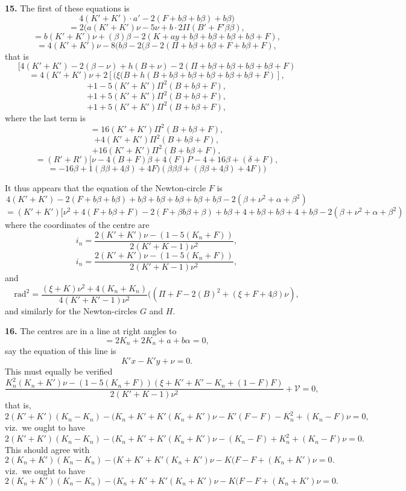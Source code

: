 \documentclass[11pt,a4paper]{article}
\begin{document}
\textbf{15.} The first of these equations is
\[
4(K' + K') \cdot a' - 2(F + b\beta + b\beta) + b\beta)
\]
\[
= 2(a (K' + K')\nu - 5\nu + b \cdot 2II (B' + F'\beta\beta),
\]
\[
= b(K' + K')\nu + (\beta)\beta - 2(K + a y + b\beta + b\beta + b\beta + b\beta + F),
\]
\[
= 4(K' + K')\nu - 8(b\beta - 2(\beta - 2(\Pi + b\beta + b\beta + F + b\beta + F),
\]
that is
\[
[4(K' + K') - 2(\beta - \nu) + h(B + \nu) - 2(\Pi + b\beta + b\beta + b\beta + b\beta + F)
\]
\[
= 4(K' + K')\nu + 2[(\xi(B + h(B + b\beta + b\beta + b\beta + b\beta + b\beta + F)],
\]
\[
+ 1 - 5(K' + K')\Pi^2(B + b\beta + F),
\]
\[
+ 1 + 5(K' + K')\Pi^2(B + b\beta + F),
\]
\[
+ 1 + 5(K' + K')\Pi^2(B + b\beta + F),
\]
where the last term is
\[
= 16(K' + K')\Pi^2(B + b\beta + F),
\]
\[
+ 4(K' + K')\Pi^2(B + b\beta + F),
\]
\[
+ 16(K' + K')\Pi^2(B + b\beta + F),
\]
\[
= (R' + R')[\nu - 4(B + F)\beta + 4(F)P - 4 + 16\beta + (\delta + F),
\]
\[
= - 16\beta + 1(\beta\beta + 4\beta) + 4F)(\beta\beta\beta + (\beta\beta + 4\beta) + 4F))
\]

It thus appears that the equation of the Newton-circle $F$ is
\[
4(K' + K') - 2(F + b\beta + b\beta) + b\beta + b\beta + b\beta + b\beta + b\beta - 2(\beta + \nu^2 + \alpha + \beta^2)
\]
\[
= (K' + K')[\nu^2 + 4(F + b\beta + F) - 2(F + \beta b\beta + \beta) + b\beta + 4 + b\beta + b\beta + 4 + b\beta - 2(\beta + \nu^2 + \alpha + \beta^2)
\]
where the coordinates of the centre are
\[
i_n = \frac{2(K' + K')\nu - (1 - 5(K_n + F))}{2(K' + K - 1)\nu^2},
\]
\[
i_n = \frac{2(K' + K')\nu - (1 - 5(K_n + F))}{2(K' + K - 1)\nu^2},
\]
and
\[
\text{rad}^2 = \frac{(\xi + K)\nu^2 + 4(K_n + K_n)}{4(K' + K' - 1)\nu^2}((\Pi + F - 2(B)^2 + (\xi + F + 4\beta)\nu),
\]
and similarly for the Newton-circles $G$ and $H$.

\textbf{16.} The centres are in a line at right angles to
\[
= 2K_n + 2K_n + a + b\alpha = 0,
\]
say the equation of this line is
\[
K' x - K' y + \nu = 0.
\]
This must equally be verified
\[
\frac{K_n^2(K_n + K')\nu - (1 - 5(K_n + F))(\xi + K' + K' - K_n + (1 - F)F)}{2(K' + K - 1)\nu^2} + \mathcal{V} = 0,
\]
that is,
\[
2(K' + K')(K_n - K_n) - (K_n + K' + K'( K_n + K')\nu - K'(F - F) - K_n^2 + (K_n - F)\nu = 0,
\]
viz.\ we ought to have
\[
2(K' + K')(K_n - K_n) - (K_n + K' + K'( K_n + K')\nu - (K_n - F) + K_n^2 + (K_n - F)\nu = 0.
\]
This should agree with
\[
2(K_n + K')(K_n - K_n) - (K + K' + K'(K_n + K')\nu - K(F - F + (K_n + K')\nu = 0.
\]
viz.\ we ought to have
\[
2(K_n + K')(K_n - K_n) - (K_n + K' + K'( K_n + K')\nu - K(F - F + (K_n + K')\nu = 0.
\]
\end{document}
